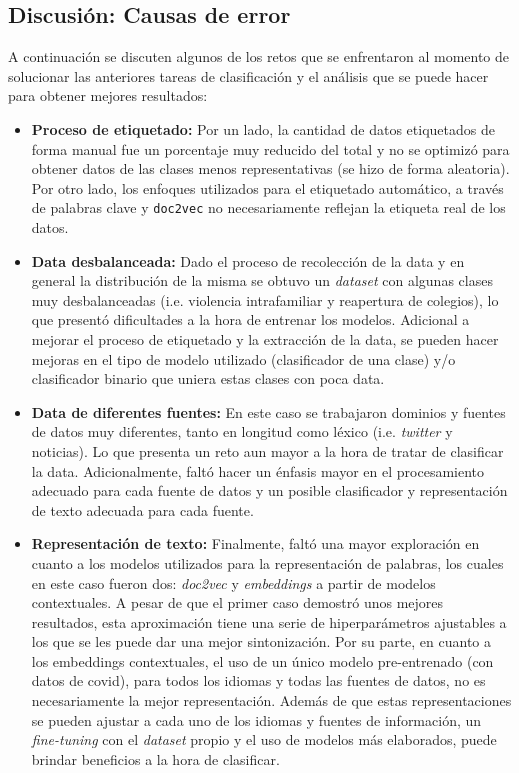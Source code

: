 \subsection{Discusión: Causas de error}

A continuación se discuten algunos de los retos que se enfrentaron al momento de solucionar las anteriores tareas de clasificación y el análisis que se puede hacer para obtener mejores resultados:

\begin{itemize}
    \item \textbf{Proceso de etiquetado:} Por un lado, la cantidad de datos etiquetados de forma manual fue un porcentaje muy reducido del total y no se optimizó para obtener datos de las clases menos representativas (se hizo de forma aleatoria). Por otro lado, los enfoques utilizados para el etiquetado automático, a través de palabras clave y \texttt{doc2vec} no necesariamente reflejan la etiqueta real de los datos.
    
    \item \textbf{Data desbalanceada:} Dado el proceso de recolección de la data y en general la distribución de la misma se obtuvo un \textit{dataset} con algunas clases muy desbalanceadas (i.e. violencia intrafamiliar y reapertura de colegios), lo que presentó dificultades a la hora de entrenar los modelos. Adicional a mejorar el proceso de etiquetado y la extracción de la data, se pueden hacer mejoras en el tipo de modelo utilizado (clasificador de una clase) y/o clasificador binario que uniera estas clases con poca data.
    
    \item \textbf{Data de diferentes fuentes:} En este caso se trabajaron dominios y fuentes de datos muy diferentes, tanto en longitud como léxico (i.e. \textit{twitter} y noticias). Lo que presenta un reto aun mayor a la hora de tratar de clasificar la data. Adicionalmente, faltó hacer un énfasis mayor en el procesamiento adecuado para cada fuente de datos y un posible clasificador y representación de texto adecuada para cada fuente.
    
    \item \textbf{Representación de texto:} Finalmente, faltó una mayor exploración en cuanto a los modelos utilizados para la representación de palabras, los cuales en este caso fueron dos: \textit{doc2vec} y \textit{embeddings} a partir de modelos contextuales. A pesar de que el primer caso demostró unos mejores resultados, esta aproximación tiene una serie de hiperparámetros ajustables a los que se les puede dar una mejor sintonización. Por su parte, en cuanto a los embeddings contextuales, el uso de un único modelo pre-entrenado (con datos de covid), para todos los idiomas y todas las fuentes de datos, no es necesariamente la mejor representación. Además de que estas representaciones se pueden ajustar a cada uno de los idiomas y fuentes de información, un \textit{fine-tuning} con el \textit{dataset} propio y el uso de modelos más elaborados, puede brindar beneficios a la hora de clasificar.
\end{itemize}

